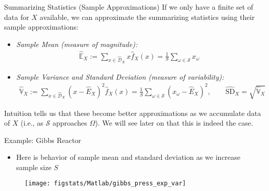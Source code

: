\documentclass[9pt]{beamer}
\begin{document}
%
\begin{frame}{Summarizing Statistics (Sample Approximations)}
If we only have a finite set of data for $X$ available, we can approximate the summarizing statistics using their sample approximations: 
\begin{block}{}
\begin{itemize}
\item {\em Sample Mean (measure of magnitude):} 
\begin{align*}
\hat{\mathbb{E}}_X:=\sum_{x\in \hat{\mathcal{D}}_X}x\hat{f}_X(x)=\frac{1}{S}\sum_{\omega\in \mathcal{S}}x_\omega
\end{align*}
\item {\em Sample Variance and Standard Deviation (measure of variability):} 
\begin{align*}
\hat{\mathbb{V}}_X:=\sum_{x\in \hat{\mathcal{D}}_X}(x-\hat{E}_X)^2\hat{f}_X(x)=\frac{1}{S}\sum_{\omega\in \mathcal{S}}(x_\omega-\hat{E}_X)^2,\qquad \hat{\textrm{SD}}_X=\sqrt{\hat{\mathbb{V}}_X}
\end{align*}
\end{itemize}
\end{block}
Intuition tells us that these become better approximations as we accumulate data of $X$ (i.e., as $\mathcal{S}$ approaches $\Omega$). We will see later on that this is indeed the case. 
\end{frame}

\begin{frame}{Example: Gibbs Reactor}
\begin{itemize}
\item Here is behavior of sample mean and standard deviation as we increase sample size $S$
\end{itemize}
\begin{figure}[!htb]
    \centering
	\texttt{[image: figstats/Matlab/gibbs\_press\_exp\_var]}
\end{figure}

\end{frame}
\end{document}
